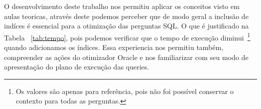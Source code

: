 \documentclass[a4paper,12pt]{article}
\begin{document}
O desenvolvimento deste trabalho nos permitiu aplicar os conceitos visto em
aulas teoricas, através deste podemos perceber que de modo geral a inclusão
de indíces é essencial para a otimização das perguntas SQL. O que é
justificado na Tabela ~\ref{tab:tempo}, pois podemos verificar que
o tempo de execução diminui~\footnote{Os valores são apenas para
referência, pois não foi possível conservar o contexto para todas as
perguntas.} quando adicionamos os índices. Essa experiencia
nos permitiu também, compreender as ações do otimizador Oracle e
nos familiarizar com seu modo de apresentação do plano de execução
das queries.
\end{document}
